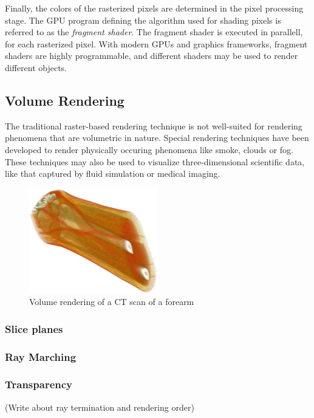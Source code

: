 \documentclass{article}
\begin{document}
Finally, the colors of the rasterized pixels are determined in the pixel processing stage.
The GPU program defining the algorithm used for shading pixels is referred to as the \textit{fragment shader}.
The fragment shader is executed in parallell, for each rasterized pixel. With modern GPUs and graphics frameworks, fragment shaders are highly programmable, and different shaders may be used to render different objects.

\subsection{Volume Rendering}
The traditional raster-based rendering technique is not well-suited for rendering phenomena that are volumetric in nature.
Special rendering techniques have been developed to render physically occuring phenomena like smoke, clouds or fog. These techniques
may also be used to visualize three-dimensional scientific data, like that captured by fluid simulation or medical imaging.

\begin{figure}[tbh]
    \centering
    \includegraphics[width=0.5\textwidth]{images/VolumeRendering.png}
    \caption{Volume rendering of a CT scan of a forearm}
    \label{fig:forearmCT}
\end{figure}

\subsubsection{Slice planes}

\subsubsection{Ray Marching}

\subsubsection{Transparency}
(Write about ray termination and rendering order)




\end{document}

